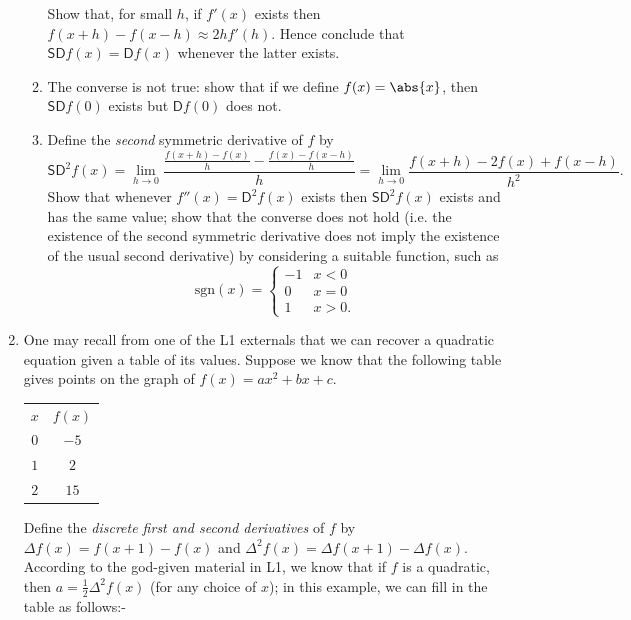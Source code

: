 \begin{enumerate}
\begin{enumerate}
            Show that, for small $ h $, if $ f'(x) $ exists then $ f(x + h) - f(x - h) \approx 2hf'(h) $. Hence
            conclude that $ \mathsf{SD}f(x) = \mathsf{D}f(x) $ whenever the latter exists.
      \item The converse is not true: show that if we define $ f(x) = \abs{x} $, then $ \mathsf{SD} f(0) $ exists
            but $ \mathsf{D} f(0) $ does not.
      \item Define the \emph{second} symmetric derivative of $ f $ by
            \begin{displaymath}
              \mathsf{SD}^2 f(x) = \lim_{h \to 0} \frac{\frac{f(x + h) - f(x)}{h} - \frac{f(x) - f(x - h)}{h}}{h} = \lim_{h \to 0} \frac{f(x + h) - 2f(x) + f(x - h)}{h^2}.
            \end{displaymath}
            Show that whenever $ f''(x) = \mathsf{D}^2 f(x) $ exists then $ \mathsf{SD}^2 f(x) $ exists and has the same value; show that the converse
            does not hold (i.e. the existence of the second symmetric derivative does not imply the existence of the usual second derivative)
            by considering a suitable function, such as
            \begin{displaymath}
              \mathrm{sgn}(x) = \begin{cases} -1 & x < 0 \\ 0 & x = 0 \\ 1 & x > 0. \end{cases}
            \end{displaymath}
    \end{enumerate}
  \item One may recall from one of the L1 externals that we can recover a quadratic equation given a table of its values. Suppose
        we know that the following table gives points on the graph of $ f(x) = ax^2 + bx + c $.

        \begin{tabular}{c|c}
          $ x $ & $ f(x) $ \\
          $ 0 $ & $ -5 $ \\
          $ 1 $ & $ 2 $ \\
          $ 2 $ & $ 15 $
        \end{tabular}

        Define the \emph{discrete first and second derivatives} of $ f $ by $ \Delta f(x) = f(x + 1) - f(x) $ and $ \Delta^2 f(x) = \Delta f(x + 1) - \Delta f(x)  $.
        According to the god-given material in L1, we know that if $ f $ is a quadratic, then $ a = \frac{1}{2} \Delta^2 f(x) $ (for any choice of $ x $); in this
        example, we can fill in the table as follows:-


\end{enumerate}
